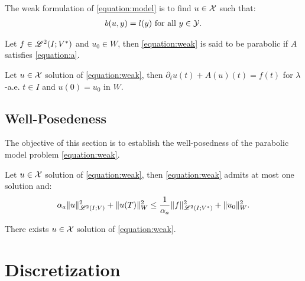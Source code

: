 \begin{definition}
    The weak formulation of \cref{equation:model} is to find $u \in \mathcal{X}$ such that:
    \begin{align}
        b(u, y) = l(y) \text{ for all } y \in \mathcal{Y}. \label{equation:weak}
    \end{align}
\end{definition}

\begin{definition}
    Let $f \in \mathscr{L}^{2}(I; V^*)$ and $u_0 \in W$, then \cref{equation:weak} is said to be parabolic if $A$ satisfies \cref{equation:a}.
\end{definition}

\begin{lemma}
    Let $u \in \mathcal{X}$ solution of \cref{equation:weak}, then $\partial_t u(t) + A(u)(t) = f(t)$ for $\lambda$-a.e. $t \in I$ and $u(0) = u_0$ in $W$.
\end{lemma}

\newpage
\subsection{Well-Posedeness} \label{subsection:well_posedeness}

The objective of this section is to establish the well-posedness of the parabolic model problem \cref{equation:weak}.

\begin{lemma}
    Let $u \in \mathcal{X}$ solution of \cref{equation:weak}, then \cref{equation:weak} admits at most one solution and:
    \begin{align}
        \alpha_{a} \lVert u \rVert_{\mathscr{L}^{2}(I; V)}^2 + \lVert u(T) \rVert_W^2 \leq \frac{1}{\alpha_{a}} \lVert f \rVert_{\mathscr{L}^{2}(I; V^*)}^2 + \lVert u_0 \rVert_W^2.
    \end{align}
\end{lemma}

\begin{lemma}[Existence]
    There exists $u \in \mathcal{X}$ solution of \cref{equation:weak}.
\end{lemma}

\newpage
\section{Discretization} \label{section:dg_discretization}

